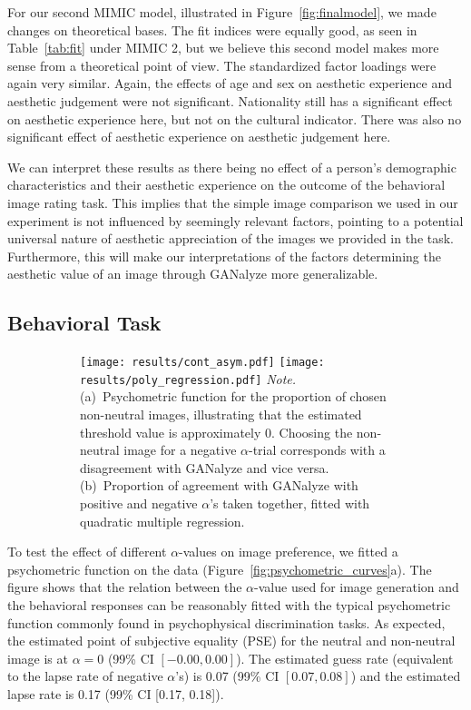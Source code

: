 \documentclass[../main.tex]{subfiles}
\begin{document}
For our second MIMIC model, illustrated in Figure~\ref{fig:finalmodel}, we made changes on theoretical bases. The fit indices were equally good, as seen in Table~\ref{tab:fit} under MIMIC 2, but we believe this second model makes more sense from a theoretical point of view. The standardized factor loadings were again very similar. Again, the effects of age and sex on aesthetic experience and aesthetic judgement were not significant. Nationality still has a significant effect on aesthetic experience here, but not on the cultural indicator. There was also no significant effect of aesthetic experience on aesthetic judgement here.



We can interpret these results as there being no effect of a person's demographic characteristics and their aesthetic experience on the outcome of the behavioral image rating task. This implies that the simple image comparison we used in our experiment is not influenced by seemingly relevant factors, pointing to a potential universal nature of aesthetic appreciation of the images we provided in the task. Furthermore, this will make our interpretations of the factors determining the aesthetic value of an image through GANalyze more generalizable.



\subsection{Behavioral Task}

\begin{figure}[!tb]
	\caption{Behavioral Results from the Image Rating Task}
	\label{fig:psychometric_curves}
	\centering
	\begin{subfigure}{\textwidth}
		{\centering
			\texttt{[image: results/cont\_asym.pdf]}
			\hfill
			\texttt{[image: results/poly\_regression.pdf]}}
		{\textit{Note.} (a)~Psychometric function for the proportion of chosen non-neutral images, illustrating that the estimated threshold value is approximately 0. Choosing the non-neutral image for a negative $\alpha$-trial corresponds with a disagreement with GANalyze and vice versa. (b)~Proportion of agreement with GANalyze with positive and negative $\alpha$'s taken together, fitted with quadratic multiple regression.}
	\end{subfigure}
\end{figure}

To test the effect of different $\alpha$-values on image preference, we fitted a psychometric function on the data (Figure~\ref{fig:psychometric_curves}a). The figure shows that the relation between the $\alpha$-value used for image generation and the behavioral responses can be reasonably fitted with the typical psychometric function commonly found in psychophysical discrimination tasks. As expected, the estimated point of subjective equality (PSE) for the neutral and non-neutral image is at $\alpha = 0$ (99\% CI $[-0.00, 0.00]$). The estimated guess rate (equivalent to the lapse rate of negative $\alpha$'s) is 0.07 (99\% CI $[0.07, 0.08]$) and the estimated lapse rate is 0.17 (99\% CI [0.17, 0.18]).
\end{document}
